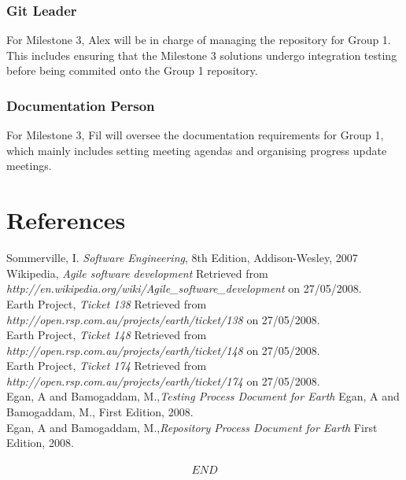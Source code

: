\documentclass[10pt,a4,oneside]{article}
\begin{document}
\subsubsection{Git Leader}

For Milestone 3, Alex will be in charge of managing the repository for Group 1. This includes ensuring that the Milestone 3 solutions undergo integration testing before being commited onto the Group 1 repository.


\subsubsection{Documentation Person}

For Milestone 3, Fil will oversee the documentation requirements for Group 1, which mainly includes setting meeting agendas and organising progress update meetings.

\newpage

\section{References}
 
Sommerville, I. \textit{Software Engineering}, 8th Edition,  Addison-Wesley, 2007\\
\newline
Wikipedia, \textit{Agile software development} Retrieved from \emph{http://en.wikipedia.org/wiki/Agile\_software\_development} on 27/05/2008.\\
\newline
Earth Project, \textit{Ticket 138} Retrieved from \emph{http://open.rsp.com.au/projects/earth/ticket/138} on 27/05/2008.\\
\newline
Earth Project, \textit{Ticket 148} Retrieved from \emph{http://open.rsp.com.au/projects/earth/ticket/148} on 27/05/2008.\\
\newline
Earth Project, \textit{Ticket 174} Retrieved from \emph{http://open.rsp.com.au/projects/earth/ticket/174} on 27/05/2008.\\
\newline
Egan, A and Bamogaddam, M.,\textit{Testing Process Document for Earth} Egan, A and Bamogaddam, M., First Edition, 2008.\\
\newline
Egan, A and Bamogaddam, M.,\textit{Repository Process Document for Earth}  First Edition, 2008.\\

\paragraph{}

\[ END\]
\end{document}
